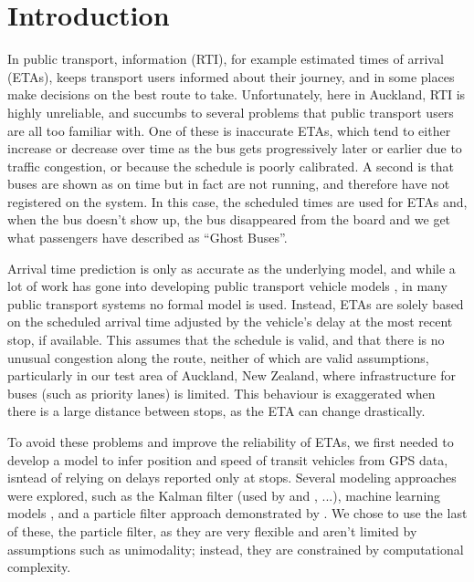 \section{Introduction}
\label{sec:intro}



In public transport, \rt information (RTI), for example estimated times of arrival (ETAs),
keeps transport users informed about their journey,
and in some places make decisions on the best route to take.
Unfortunately, here in Auckland, RTI is highly unreliable,
and succumbs to several problems that public transport users
are all too familiar with.
One of these is inaccurate ETAs,
which tend to either increase or decrease over time as the bus gets progressively later or earlier
due to traffic congestion, or  because the schedule is poorly calibrated.
A second is that buses are shown as on time but in fact are not running,
and therefore have not registered on the \rt system.
In this case, the scheduled times are used for ETAs and, 
when the bus doesn't show up, 
the bus disappeared from the \rt board and we get what passengers have described as ``Ghost Buses''.

Arrival time prediction is only as accurate as the underlying model,
and while a lot of work has gone into developing public transport vehicle models
\citep{Cathey_2003,Jeong_2005,Yu_2011,Hans_2015},
in many public transport systems no formal model is used.
Instead, ETAs are solely based on the scheduled arrival time
adjusted by the vehicle's delay at the most recent stop, if available.
This assumes that the schedule is valid,
and that there is no unusual congestion along the route,
neither of which are valid assumptions,
particularly in our test area of Auckland, New Zealand,
where infrastructure for buses (such as priority lanes) is limited.
This behaviour is exaggerated when there is a large distance between stops,
as the ETA can change drastically.


To avoid these problems and improve the reliability of ETAs,
we first needed to develop a model to infer position and speed
of transit vehicles from \rt GPS data,
isntead of relying on delays reported only at stops.
Several modeling approaches were explored, 
such as the Kalman filter (used by \cite{Dailey_2001} and \cite{Cathey_2003}, ...),
machine learning models \citep{Yu_2006,Chang_2010},
and a particle filter approach demonstrated
by \cite{Hans_2015}.
We chose to use the last of these, the particle filter,
as they are very flexible and aren't limited by assumptions
such as unimodality;
instead, they are constrained by computational complexity.


